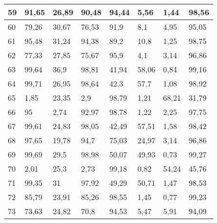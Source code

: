 \begin{longtable}[c]{|l|l|l|l|l|l|l|l|}
59              & 91,65        & 26,89        & 90,48       & 94,44         & 5,56          & 1,44          & 98,56         \\ \hline
60              & 79,26        & 30,67        & 76,53       & 91,9          & 8,1           & 4,95          & 95,05         \\ \hline
61              & 95,48        & 31,24        & 94,38       & 89,2          & 10,8          & 1,25          & 98,75         \\ \hline
62              & 77,33        & 27,85        & 75,67       & 95,9          & 4,1           & 3,14          & 96,86         \\ \hline
63              & 99,64        & 36,9         & 98,81       & 41,94         & 58,06         & 0,84          & 99,16         \\ \hline
64              & 99,71        & 26,95        & 98,64       & 42,3          & 57,7          & 1,08          & 98,92         \\ \hline
65              & 1,85         & 23,35        & 2,9         & 98,79         & 1,21          & 68,21         & 31,79         \\ \hline
66              & 95           & 2,74         & 92,97       & 98,78         & 1,22          & 2,25          & 97,75         \\ \hline
67              & 99,61        & 24,83        & 98,05       & 42,49         & 57,51         & 1,58          & 98,42         \\ \hline
68              & 97,65        & 19,78        & 94,7        & 75,03         & 24,97         & 3,14          & 96,86         \\ \hline
69              & 99,69        & 29,5         & 98,98       & 50,07         & 49,93         & 0,73          & 99,27         \\ \hline
70              & 2,01         & 25,3         & 2,73        & 99,18         & 0,82          & 54,24         & 45,76         \\ \hline
71              & 99,35        & 31           & 97,92       & 49,29         & 50,71         & 1,47          & 98,53         \\ \hline
72              & 85,79        & 23,91        & 85,26       & 98,55         & 1,45          & 0,77          & 99,23         \\ \hline
73              & 73,63        & 24,82        & 70,8        & 94,53         & 5,47          & 5,91          & 94,09         \\ \hline

\end{longtable}
